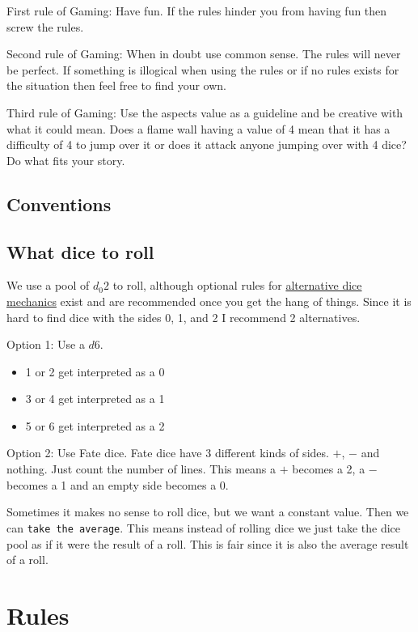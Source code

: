 \documentclass[11pt]{article}
\begin{document}
{First rule of Gaming: Have fun. If the rules hinder you from having fun then screw the rules.

Second rule of Gaming: When in doubt use common sense. The rules will never be perfect. If something is illogical when using the rules or if no rules exists for the situation then feel free to find your own. 

Third rule of Gaming: Use the aspects value as a guideline and be creative with what it could mean. Does a flame wall having a value of 4 mean that it has a difficulty of 4 to jump over it or does it attack anyone jumping over with 4 dice? Do what fits your story. 


\subsection{Conventions}
\label{sec:orgea3a404}



\subsection{What dice to roll}
\label{sec:orgebdce0b}
We use a pool of \(d_0 2\) to roll, although optional rules for \hyperref[sec:org411da3b]{alternative dice mechanics} exist and are recommended once you get the hang of things. Since it is hard to find dice with the sides 0, 1, and 2 I recommend 2 alternatives.

Option 1: Use a \(d6\).
\begin{itemize}
\item 1 or 2 get interpreted as a 0
\item 3 or 4 get interpreted as a 1
\item 5 or 6 get interpreted as a 2
\end{itemize}

Option 2: Use Fate dice. Fate dice have 3 different kinds of sides. \(+\), \(-\) and nothing. Just count the number of lines. This means a \(+\) becomes a 2, a \(-\) becomes a 1 and an empty side becomes a \(0\).

Sometimes it makes no sense to roll dice, but we want a constant value. Then we can \texttt{take the average}. This means instead of rolling dice we just take the dice pool as if it were the result of a roll. This is fair since it is also the average result of a roll.

\newpage
\section{Rules}
\label{sec:orge5fe18a}

}
\end{document}
